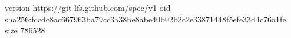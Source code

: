 version https://git-lfs.github.com/spec/v1
oid sha256:fccdc8ac667963ba79cc3a38be8abe40b02b2c2e33871448f5efe33d4c76a1fe
size 786528
